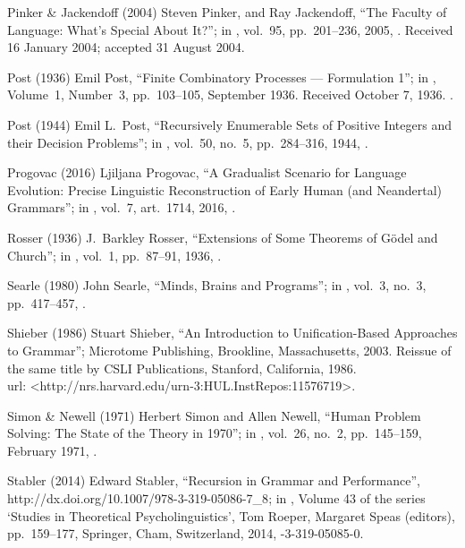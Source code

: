  Pinker \& Jackendoff (2004)
Steven Pinker, and Ray Jackendoff,
``The Faculty of Language: What’s Special About It?'';
in ,
vol.\ 95, pp.\ 201--236, 2005,
.
Received 16 January 2004; accepted 31 August 2004.

 Post (1936)
Emil Post,
``Finite Combinatory Processes --- Formulation 1'';
in ,
Volume\ 1, Number\ 3, pp.~103--105, September 1936.
Received October 7, 1936.
.

 Post (1944)
Emil L.\ Post,
``Recursively Enumerable Sets of Positive Integers
  and their Decision Problems'';
in ,
vol.\ 50, no.~5, pp.\ 284--316, 1944,
.

 Progovac (2016)
Ljiljana Progovac,
``A Gradualist
Scenario for Language Evolution:
Precise Linguistic Reconstruction of
Early Human (and Neandertal) Grammars'';
in ,
vol.\ 7, art.\ 1714, 2016,
.

 Rosser (1936)
J.\ Barkley Rosser,
``Extensions of Some Theorems of G\"odel and Church'';
in ,
vol.\ 1, pp.\ 87--91, 1936,
.

 Searle (1980)
John Searle,
``Minds, Brains and Programs'';
in ,
vol.\ 3, no.\ 3, pp.\ 417--457,
.

 Shieber (1986)
Stuart Shieber,
``An Introduction to Unification-Based Approaches to Grammar'';
Microtome Publishing, Brookline, Massachusetts, 2003.
Reissue of the same title by
CSLI Publications, Stanford, California, 1986.\\
{\sc url:} \URL<http://nrs.harvard.edu/urn-3:HUL.InstRepos:11576719>.

 Simon \& Newell (1971)
Herbert Simon and Allen Newell,
``Human Problem Solving: The State of the Theory in 1970'';
in ,
 vol.\ 26, no.\ 2, pp.\ 145--159, February 1971,
.

 Stabler (2014)
Edward Stabler,
``Recursion in Grammar and Performance'',\\
%
{http://dx.doi.org/10.1007/978-3-319-05086-7_8};
in ,
Volume 43 of the series `Studies in Theoretical Psycholinguistics',
Tom Roeper, Margaret Speas (editors),
pp.\ 159--177,
Springer, Cham, Switzerland, 2014,
-3-319-05085-0.

